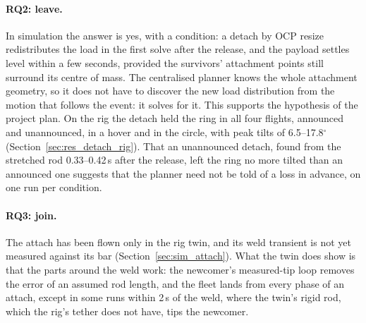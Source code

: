 \paragraph{RQ2: leave.} In simulation the answer is yes, with a condition: a detach by OCP resize
redistributes the load in the first solve after the release, and the payload settles level within a few
seconds, provided the survivors' attachment points still surround its centre of mass. The centralised planner
knows the whole attachment geometry, so it does not have to discover the new load distribution from the motion
that follows the event: it solves for it. This supports the hypothesis of the project plan. On the rig the
detach held the ring in all four flights, announced and unannounced, in a hover and in the circle, with peak
tilts of 6.5--17.8$^\circ$ (Section~\ref{sec:res_detach_rig}). That an unannounced detach, found from the
stretched rod 0.33--0.42\,s after the release, left the ring no more tilted than an announced one suggests that
the planner need not be told of a loss in advance, on one run per condition.

\paragraph{RQ3: join.} The attach has been flown only in the rig twin, and its weld transient is not yet
measured against its bar (Section~\ref{sec:sim_attach}). What the twin does show is that the parts around the
weld work: the newcomer's measured-tip loop removes the error of an assumed rod length, and the fleet lands
from every phase of an attach, except in some runs within 2\,s of the weld, where the twin's rigid rod, which
the rig's tether does not have, tips the newcomer.

